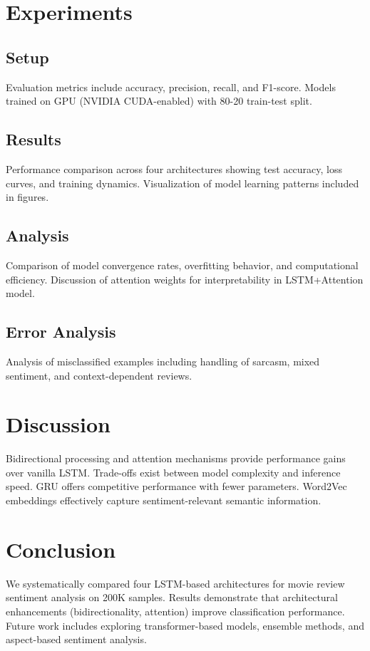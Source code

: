 \documentclass[conference]{IEEEtran}
\begin{document}
\section{Experiments}
\label{sec:experiments}
\subsection{Setup}
Evaluation metrics include accuracy, precision, recall, and F1-score. Models trained on GPU (NVIDIA CUDA-enabled) with 80-20 train-test split.
\subsection{Results}
Performance comparison across four architectures showing test accuracy, loss curves, and training dynamics. Visualization of model learning patterns included in figures.
\subsection{Analysis}
Comparison of model convergence rates, overfitting behavior, and computational efficiency. Discussion of attention weights for interpretability in LSTM+Attention model.
\subsection{Error Analysis}
Analysis of misclassified examples including handling of sarcasm, mixed sentiment, and context-dependent reviews.

\section{Discussion}
\label{sec:discussion}
Bidirectional processing and attention mechanisms provide performance gains over vanilla LSTM. Trade-offs exist between model complexity and inference speed. GRU offers competitive performance with fewer parameters. Word2Vec embeddings effectively capture sentiment-relevant semantic information.

\section{Conclusion}
\label{sec:conclusion}
We systematically compared four LSTM-based architectures for movie review sentiment analysis on 200K samples. Results demonstrate that architectural enhancements (bidirectionality, attention) improve classification performance. Future work includes exploring transformer-based models, ensemble methods, and aspect-based sentiment analysis.



\end{document}
